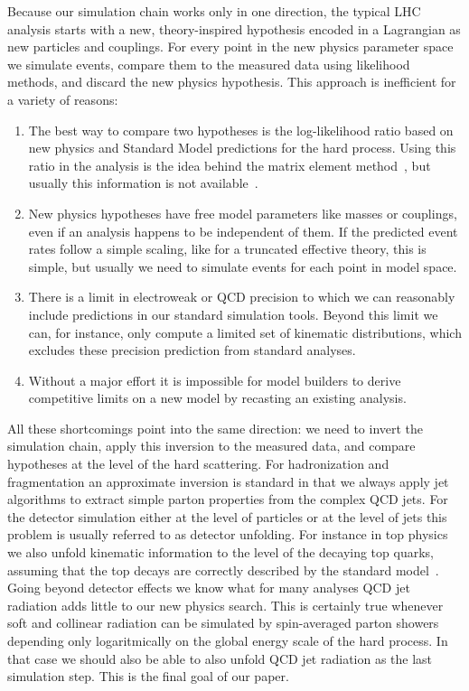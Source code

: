 Because our simulation chain works only in one direction, the typical
LHC analysis starts with a new, theory-inspired hypothesis encoded in
a Lagrangian as new particles and couplings. For every point in the
new physics parameter space we simulate events, compare them to the
measured data using likelihood methods, and discard the new physics
hypothesis. This approach is inefficient for a variety of reasons:
%
\begin{enumerate}
  \item The best way to compare two hypotheses is the log-likelihood
    ratio based on new physics and Standard Model predictions for the
    hard process. Using this ratio in the analysis is the idea behind
    the matrix element
    method~\cite{Kondo:1988yd,Martini:2015fsa,Gritsan:2016hjl,Martini:2017ydu,Kraus:2019qoq,Prestel:2019neg},
    but usually this information is not
    available~\cite{Cranmer:2019eaq}.
\item New physics hypotheses have free model parameters like masses or
  couplings, even if an analysis happens to be independent of them.
  If the predicted event rates follow a simple scaling, like for a
  truncated effective theory, this is simple, but usually we need to
  simulate events for each point in model space.
\item There is a limit in electroweak or QCD precision to which we can
  reasonably include predictions in our standard simulation
  tools. Beyond this limit we can, for instance, only compute a
  limited set of kinematic distributions, which excludes these
  precision prediction from standard analyses.
\item Without a major effort it is impossible for model builders to
  derive competitive limits on a new model by recasting an existing
  analysis.
\end{enumerate}
%
All these shortcomings point into the same direction: we need to
invert the simulation chain, apply this inversion to the measured
data, and compare hypotheses at the level of the hard scattering. For
hadronization and fragmentation an approximate inversion is standard
in that we always apply jet algorithms to extract simple parton
properties from the complex QCD jets.  For the detector simulation
either at the level of particles or at the level of jets this problem
is usually referred to as detector unfolding. For instance in top
physics we also unfold kinematic information to the level of the
decaying top quarks, assuming that the top decays are correctly
described by the standard
model~\cite{Khachatryan:2015oqa,Aad:2015mbv}. Going beyond detector
effects we know what for many analyses QCD jet radiation adds little
to our new physics search. This is certainly true whenever soft and
collinear radiation can be simulated by spin-averaged parton showers
depending only logaritmically on the global energy scale of the hard
process. In that case we should also be able to also unfold QCD jet
radiation as the last simulation step. This is the final goal of our
paper.

